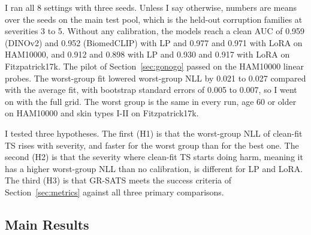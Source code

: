 \documentclass[sigconf,nonacm]{acmart}
\begin{document}
I ran all 8 settings with three seeds. Unless I say otherwise, numbers are means over the seeds on the main test pool, which is the held-out corruption families at severities 3 to 5. Without any calibration, the models reach a clean AUC of 0.959 (DINOv2) and 0.952 (BiomedCLIP) with LP and 0.977 and 0.971 with LoRA on HAM10000, and 0.912 and 0.898 with LP and 0.930 and 0.917 with LoRA on Fitzpatrick17k. The pilot of Section~\ref{sec:gonogo} passed on the HAM10000 linear probes. The worst-group fit lowered worst-group NLL by 0.021 to 0.027 compared with the average fit, with bootstrap standard errors of 0.005 to 0.007, so I went on with the full grid. The worst group is the same in every run, age 60 or older on HAM10000 and skin types I-II on Fitzpatrick17k.

I tested three hypotheses. The first (H1) is that the worst-group NLL of clean-fit TS rises with severity, and faster for the worst group than for the best one. The second (H2) is that the severity where clean-fit TS starts doing harm, meaning it has a higher worst-group NLL than no calibration, is different for LP and LoRA. The third (H3) is that GR-SATS meets the success criteria of Section~\ref{sec:metrics} against all three primary comparisons.

\subsection{Main Results}

\begin{table}[t]
  \caption{Main results on held-out corruption families at severities 3 to 5, averaged over the 8 settings and three seeds. WG means worst group. The no-noise column leaves the noise family out of the test pool. Rank is the mean rank by WG NLL over the 8 settings. The best value among methods that do not see test-time group labels is bold, and $\dagger$ marks oracles that do see them.}
  \label{tab:results}
  \footnotesize
  \centering
  
\end{table}

\begin{table}[t]
  \caption{Success test. Differences are averaged over the 8 settings, and negative means GR-SATS is better. Intervals are 95\% paired bootstrap intervals over source images (lesions on HAM10000).}
  \label{tab:success}
  \scriptsize
  \setlength{\tabcolsep}{3pt}
  \centering
  
\end{table}

\begin{table}[t]
  \caption{Worst-group NLL in each of the 8 settings, same test pool as Table~\ref{tab:results}. TS with Gaussian noise has seen the noise family, which is part of this pool.}
  \label{tab:settings}
  \footnotesize
  \centering
  
\end{table}
\end{document}
